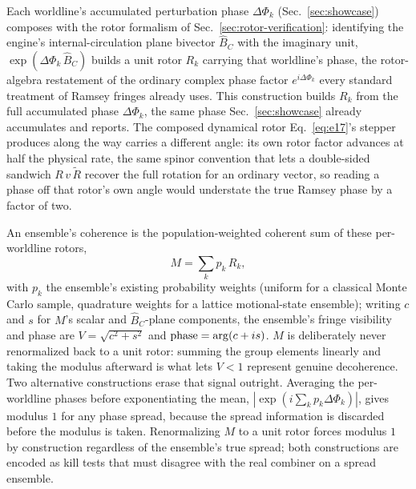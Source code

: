 \documentclass[aps,pra,superscriptaddress,groupedaddress,nofootinbib]{revtex4-2}
\begin{document}
Each worldline's accumulated perturbation phase $\Delta\Phi_k$
(Sec.~\ref{sec:showcase}) composes with the rotor formalism of
Sec.~\ref{sec:rotor-verification}: identifying the engine's internal-circulation
plane bivector $\hat B_C$ with the imaginary unit, $\exp(\Delta\Phi_k\,\hat B_C)$
builds a unit rotor $R_k$ carrying that worldline's phase, the rotor-algebra
restatement of the ordinary complex phase factor $e^{i\Delta\Phi_k}$ every
standard treatment of Ramsey fringes already uses. This construction builds
$R_k$ from the full accumulated phase $\Delta\Phi_k$, the same phase Sec.~\ref{sec:showcase}
already accumulates and reports. The composed dynamical rotor Eq.~\eqref{eq:e17}'s
stepper produces along the way carries a different angle: its own rotor
factor advances at half the physical rate, the same spinor convention that
lets a double-sided sandwich $R\,v\,\tilde R$ recover the full rotation for
an ordinary vector, so reading a phase off that rotor's own angle would
understate the true Ramsey phase by a factor of two.

An ensemble's coherence is the population-weighted coherent sum of these
per-worldline rotors,
\begin{equation*}
  M = \sum_k p_k\,R_k ,
\end{equation*}
with $p_k$ the ensemble's existing probability weights (uniform for a
classical Monte Carlo sample, quadrature weights for a lattice
motional-state ensemble); writing $c$ and $s$ for $M$'s scalar and
$\hat B_C$-plane components, the ensemble's fringe visibility and phase are
$V=\sqrt{c^2+s^2}$ and ${\rm phase}=\arg(c+is)$. $M$ is deliberately never
renormalized back to a unit rotor: summing the group elements linearly and
taking the modulus afterward is what lets $V<1$ represent genuine
decoherence. Two alternative constructions erase that signal outright.
Averaging the per-worldline phases before exponentiating the mean,
$|\exp(i\sum_k p_k\Delta\Phi_k)|$, gives modulus $1$ for any phase spread,
because the spread information is discarded before the modulus is taken.
Renormalizing $M$ to a unit rotor forces modulus $1$ by construction
regardless of the ensemble's true spread; both constructions are encoded as
kill tests that must disagree with the real combiner on a spread ensemble.
\end{document}
